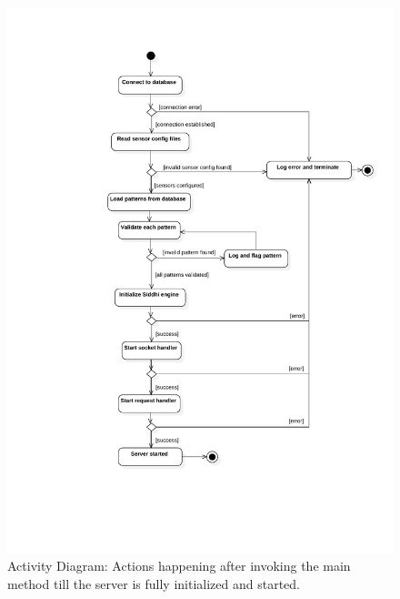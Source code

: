 \FloatBarrier
\begin{figure}[h]
    \centering
    \includegraphics[width=\textwidth]{../module_res/server-act-start.pdf}
    \caption{Activity Diagram:
        Actions happening after invoking the main method till the server is
        fully initialized and started.
    \label{fig:server-act-start}}
\end{figure}
\FloatBarrier

